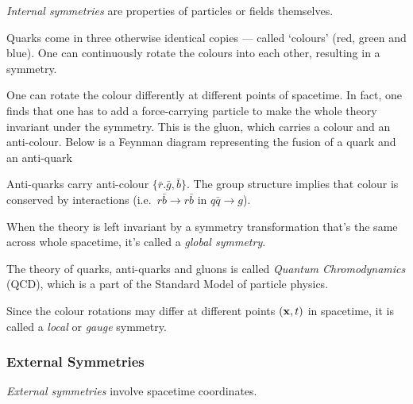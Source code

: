 \documentclass[a4paper,11pt]{article}
\begin{document}
	\emph{Internal symmetries} are properties of particles or fields themselves. 
	\begin{ex}
		Quarks come in three otherwise identical copies --- called `colours' ({\color{red}red}, {\color{green}green} and {\color{blue}blue}). One can continuously rotate the colours into each other, resulting in a symmetry.

		One can rotate the colour differently at different points of spacetime. In fact, one finds that one has to add a force-carrying particle to make the whole theory invariant under the symmetry. This is the gluon, which carries a colour and an anti-colour. Below is a Feynman diagram representing the fusion of a quark and an anti-quark
		\begin{center}
		\end{center}

		Anti-quarks carry anti-colour $\{\bar{r}.\bar{g},\bar{b}\}$. The group structure implies that colour is conserved by interactions (i.e.\ $r \bar{b} \to r \bar{b}$ in $q \bar{q}\to g$).
	\end{ex}
	When the theory is left invariant by a symmetry transformation that's the same across whole spacetime, it's called a \emph{global symmetry}. 

	The theory of quarks, anti-quarks and gluons is called \emph{Quantum Chromodynamics} (QCD), which is a part of the Standard Model of particle physics.

	Since the colour rotations may differ at different points $(\vb x,t)$ in spacetime, it is called a \emph{local} or \emph{gauge} symmetry.

	\subsubsection{External Symmetries}

	\emph{External symmetries} involve spacetime coordinates.
\end{document}
